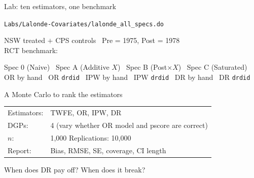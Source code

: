 \documentclass[aspectratio=169,11pt]{beamer}
\begin{document}
\begin{frame}{Lab: ten estimators, one benchmark}
\vspace{0.6em}
\begin{center}
\texttt{Labs/Lalonde-Covariates/lalonde\_all\_specs.do}
\end{center}
\vspace{0.6em}
\begin{center}
\color{warmgray}\small
NSW treated $+$ CPS controls \textperiodcentered\
Pre = 1975, Post = 1978\\[0.4em]
RCT benchmark: 
\end{center}
\vspace{0.4em}
\begin{center}
Spec 0 (Naive) \textperiodcentered\ Spec A (Additive $X$) \textperiodcentered\ Spec B (Post$\times X$) \textperiodcentered\ Spec C (Saturated)\\[0.3em]
OR by hand \textperiodcentered\ OR \texttt{drdid} \textperiodcentered\
IPW by hand \textperiodcentered\ IPW \texttt{drdid} \textperiodcentered\
DR by hand \textperiodcentered\ DR \texttt{drdid}
\end{center}
\end{frame}


\begin{frame}{A Monte Carlo to rank the estimators}
\vspace{0.6em}
\begin{center}
\begin{tabular}{ll}
  Estimators: & TWFE, OR, IPW, DR \\[0.4em]
  DGPs:       & 4 (vary whether OR model and pscore are correct) \\[0.4em]
  $n$:        & 1{,}000 \quad Replications: 10{,}000 \\[0.4em]
  Report:     & Bias, RMSE, SE, coverage, CI length \\
\end{tabular}
\end{center}
\vspace{0.5em}
\begin{center}
\color{warmgray}\small
When does DR pay off? When does it break?
\end{center}
\end{frame}
\end{document}
